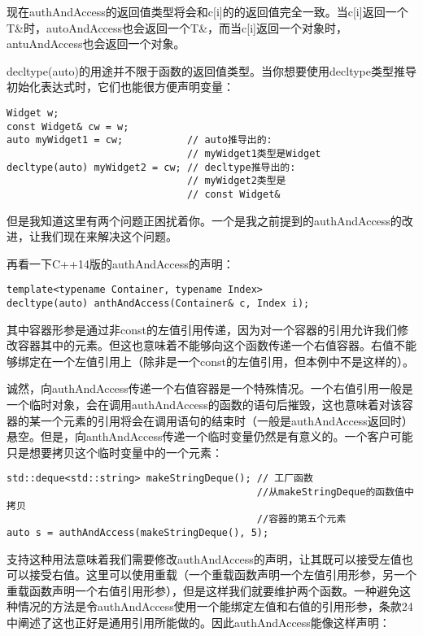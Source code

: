 现在authAndAccess的返回值类型将会和c[i]的的返回值完全一致。当c[i]返回一个T\&时，autoAndAccess也会返回一个T\&，而当c[i]返回一个对象时，antuAndAccess也会返回一个对象。

decltype(auto)的用途并不限于函数的返回值类型。当你想要使用decltype类型推导初始化表达式时，它们也能很方便声明变量：

\begin{lstlisting}
Widget w; 
const Widget& cw = w; 
auto myWidget1 = cw;           // auto推导出的: 
                               // myWidget1类型是Widget 
decltype(auto) myWidget2 = cw; // decltype推导出的: 
                               // myWidget2类型是 
                               // const Widget&
\end{lstlisting}

但是我知道这里有两个问题正困扰着你。一个是我之前提到的authAndAccess的改进，让我们现在来解决这个问题。

再看一下C++14版的authAndAccess的声明：
\begin{lstlisting}
template<typename Container, typename Index>
decltype(auto) anthAndAccess(Container& c, Index i);
\end{lstlisting}

其中容器形参是通过非const的左值引用传递，因为对一个容器的引用允许我们修改容器其中的元素。但这也意味着不能够向这个函数传递一个右值容器。右值不能够绑定在一个左值引用上（除非是一个const的左值引用，但本例中不是这样的）。

诚然，向authAndAccess传递一个右值容器是一个特殊情况。一个右值引用一般是一个临时对象，会在调用authAndAccess的函数的语句后摧毁，这也意味着对该容器的某一个元素的引用将会在调用语句的结束时（一般是authAndAccess返回时）悬空。但是，向anthAndAccess传递一个临时变量仍然是有意义的。一个客户可能只是想要拷贝这个临时变量中的一个元素：

\begin{lstlisting}
std::deque<std::string> makeStringDeque(); // 工厂函数 
                                           //从makeStringDeque的函数值中拷贝 
                                           //容器的第五个元素 
auto s = authAndAccess(makeStringDeque(), 5);
\end{lstlisting}

支持这种用法意味着我们需要修改authAndAccess的声明，让其既可以接受左值也可以接受右值。这里可以使用重载（一个重载函数声明一个左值引用形参，另一个重载函数声明一个右值引用形参），但是这样我们就要维护两个函数。一种避免这种情况的方法是令authAndAccess使用一个能绑定左值和右值的引用形参，条款24中阐述了这也正好是通用引用所能做的。因此authAndAccess能像这样声明：

